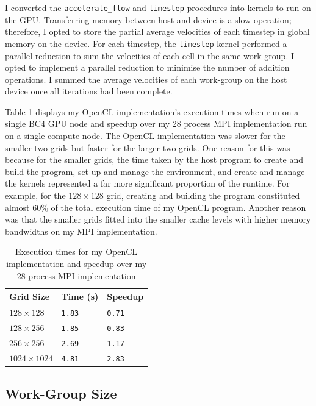 \documentclass[twocolumn, a4paper]{article}
\begin{document}
I converted the \texttt{accelerate\_flow} and \texttt{timestep} procedures into kernels to run on the GPU.
Transferring memory between host and device is a slow operation; therefore, I opted to store the partial average velocities of each timestep in global memory on the device.
For each timestep, the \texttt{timestep} kernel performed a parallel reduction to sum the velocities of each cell in the same work-group.
I opted to implement a parallel reduction to minimise the number of addition operations.
I summed the average velocities of each work-group on the host device once all iterations had been complete.

Table \ref{tab:OpenCL} displays my OpenCL implementation's execution times when run on a single BC4 GPU node and speedup over my 28 process MPI implementation run on a single compute node.
The OpenCL implementation was slower for the smaller two grids but faster for the larger two grids.
One reason for this was because for the smaller grids, the time taken by the host program to create and build the program, set up and manage the environment, and create and manage the kernels represented a far more significant proportion of the runtime.
For example, for the $128 \times 128$ grid, creating and building the program constituted almost 60\% of the total execution time of my OpenCL program.
Another reason was that the smaller grids fitted into the smaller cache levels with higher memory bandwidths on my MPI implementation.

\begin{table}[htbp]
  \begin{center}
  \caption{Execution times for my OpenCL implementation and speedup over my 28 process MPI implementation}\label{tab:OpenCL}
  \begin{tabular}[t]{l | l l} 
      \hline\hline
      Grid Size&Time (s)&Speedup\\
      \hline
      $128 \times 128$&\texttt{1.83}&\texttt{0.71}\\
      $128 \times 256$&\texttt{1.85}&\texttt{0.83}\\
      $256 \times 256$&\texttt{2.69}&\texttt{1.17}\\
      $1024 \times 1024$&\texttt{4.81}&\texttt{2.83}\\
      \hline
    \end{tabular}
  \end{center}
  \vspace{-1em}
\end{table}

\subsection{Work-Group Size}
\end{document}
